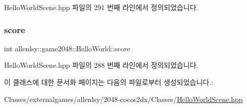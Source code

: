 Hello\+World\+Scene.\+hpp 파일의 291 번째 라인에서 정의되었습니다.

\mbox{\label{classallenlsy_1_1game2048_1_1_hello_world_af5e35e78792c3fe4a2d4ab6266e9c6e1}} 
\subsubsection{\texorpdfstring{score}{score}}
{\footnotesize\ttfamily int allenlsy\+::game2048\+::\+Hello\+World\+::score}



Hello\+World\+Scene.\+hpp 파일의 288 번째 라인에서 정의되었습니다.



이 클래스에 대한 문서화 페이지는 다음의 파일로부터 생성되었습니다.\+:\begin{DoxyCompactItemize}
\item 
Classes/externalgames/allenlsy/2048-\/cocos2dx/\+Classes/\hyperlink{_hello_world_scene_8hpp}{Hello\+World\+Scene.\+hpp}\end{DoxyCompactItemize}
